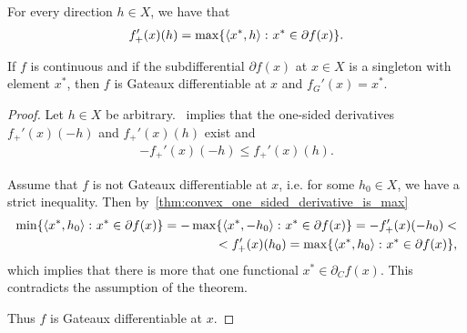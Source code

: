 \begin{proposition}
  \label{thm:convex_one_sided_derivative_is_max}
  For every direction $h \in X$, we have that
  \begin{align*}
    f_+'(x)(h) = \max\{ \left\langle x^*, h \right\rangle \colon x^* \in \partial f(x) \}.
  \end{align*}
\end{proposition}

\begin{theorem}\label{thm:singleton_subdifferential_implies_gateaux}
  If $f$ is continuous and if the subdifferential $\partial f(x)$ at $x \in X$ is a singleton with element $x^*$, then $f$ is Gateaux differentiable at $x$ and $f_G'(x) = x^*$.
\end{theorem}
\begin{proof}
  Let $h \in X$ be arbitrary.~ implies that the one-sided derivatives $f_+'(x)(-h)$ and $f_+'(x)(h)$ exist and
  \begin{align*}
    -f_+'(x)(-h) \leq f_+'(x)(h).
  \end{align*}

  Assume that $f$ is not Gateaux differentiable at $x$, i.e. for some $h_0 \in X$, we have a strict inequality. Then by~\cref{thm:convex_one_sided_derivative_is_max}
  \begin{align*}
    \min\{ \left\langle x^*, h_0 \right\rangle \colon x^* \in \partial f(x) \}
    =
    -\max\{ \left\langle x^*, -h_0 \right\rangle \colon x^* \in \partial f(x) \}
    =
    -f_+'(x)(-h_0)
    < \\ <
    f_+'(x)(h_0)
    =
    \max\{ \left\langle x^*, h_0 \right\rangle \colon x^* \in \partial f(x) \},
  \end{align*}
  which implies that there is more that one functional $x^* \in \partial_C f(x)$. This contradicts the assumption of the theorem.

  Thus $f$ is Gateaux differentiable at $x$.
\end{proof}
